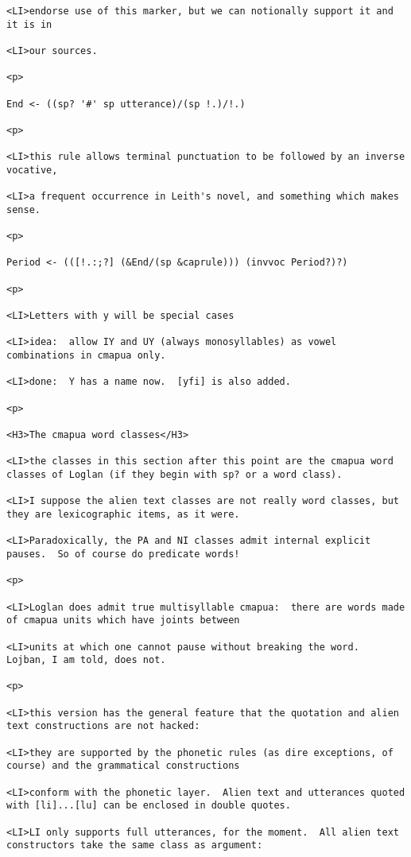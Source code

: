 \documentclass[12pt]{article}
\begin{document}
\begin{lstlisting}
<LI>endorse use of this marker, but we can notionally support it and it is in

<LI>our sources.

<p>

End <- ((sp? '#' sp utterance)/(sp !.)/!.)

<p>

<LI>this rule allows terminal punctuation to be followed by an inverse vocative,

<LI>a frequent occurrence in Leith's novel, and something which makes sense.

<p>

Period <- (([!.:;?] (&End/(sp &caprule))) (invvoc Period?)?)

<p>

<LI>Letters with y will be special cases

<LI>idea:  allow IY and UY (always monosyllables) as vowel combinations in cmapua only.

<LI>done:  Y has a name now.  [yfi] is also added.

<p>

<H3>The cmapua word classes</H3>

<LI>the classes in this section after this point are the cmapua word classes of Loglan (if they begin with sp? or a word class).

<LI>I suppose the alien text classes are not really word classes, but they are lexicographic items, as it were.

<LI>Paradoxically, the PA and NI classes admit internal explicit pauses.  So of course do predicate words!

<p>

<LI>Loglan does admit true multisyllable cmapua:  there are words made of cmapua units which have joints between

<LI>units at which one cannot pause without breaking the word.  Lojban, I am told, does not.

<p>

<LI>this version has the general feature that the quotation and alien text constructions are not hacked:

<LI>they are supported by the phonetic rules (as dire exceptions, of course) and the grammatical constructions

<LI>conform with the phonetic layer.  Alien text and utterances quoted with [li]...[lu] can be enclosed in double quotes.

<LI>LI only supports full utterances, for the moment.  All alien text constructors take the same class as argument:


\end{lstlisting}
\end{document}
